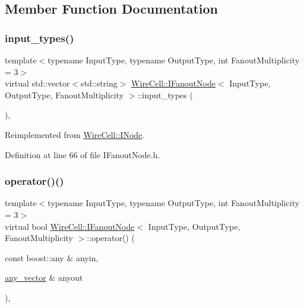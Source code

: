 \subsection{Member Function Documentation}
\mbox{\label{class_wire_cell_1_1_i_fanout_node_a61d7f915d2c0b6275827e7d63b9a03b2}} 
\subsubsection{\texorpdfstring{input\+\_\+types()}{input\_types()}}
{\footnotesize\ttfamily template$<$typename Input\+Type, typename Output\+Type, int Fanout\+Multiplicity = 3$>$ \\
virtual std\+::vector$<$std\+::string$>$ \hyperlink{class_wire_cell_1_1_i_fanout_node}{Wire\+Cell\+::\+I\+Fanout\+Node}$<$ Input\+Type, Output\+Type, Fanout\+Multiplicity $>$\+::input\+\_\+types (\begin{DoxyParamCaption}{ }\end{DoxyParamCaption})\hspace{0.3cm}{\ttfamily [inline]}, {\ttfamily [virtual]}}



Reimplemented from \hyperlink{class_wire_cell_1_1_i_node_ae13fc140c8e815fac9327dfa5b43f853}{Wire\+Cell\+::\+I\+Node}.



Definition at line 66 of file I\+Fanout\+Node.\+h.

\mbox{\label{class_wire_cell_1_1_i_fanout_node_a813e5346a910147df1d57d955c303129}} 
\subsubsection{\texorpdfstring{operator()()}{operator()()}\hspace{0.1cm}{\footnotesize\ttfamily [1/2]}}
{\footnotesize\ttfamily template$<$typename Input\+Type, typename Output\+Type, int Fanout\+Multiplicity = 3$>$ \\
virtual bool \hyperlink{class_wire_cell_1_1_i_fanout_node}{Wire\+Cell\+::\+I\+Fanout\+Node}$<$ Input\+Type, Output\+Type, Fanout\+Multiplicity $>$\+::operator() (\begin{DoxyParamCaption}\item[{const boost\+::any \&}]{anyin,  }\item[{\hyperlink{class_wire_cell_1_1_i_fanout_node_base_a855b32ed7f2d37d84aaf21e94edeacc4}{any\+\_\+vector} \&}]{anyout }\end{DoxyParamCaption})\hspace{0.3cm}{\ttfamily [inline]}, {\ttfamily [virtual]}}



